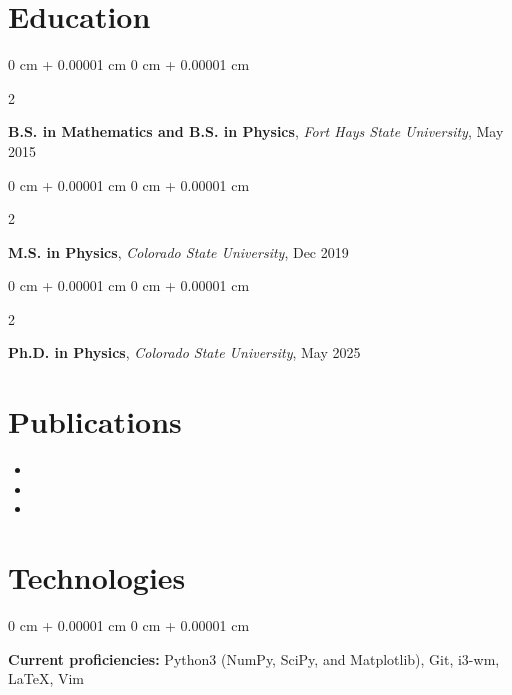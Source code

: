 \documentclass[10pt, letterpaper]{article}
\newenvironment{highlights}{
    \begin{itemize}[
        topsep=0.10 cm,
        parsep=0.10 cm,
        partopsep=0pt,
        itemsep=0pt,
        leftmargin=0 cm + 10pt
    ]
}{
    \end{itemize}
} %
\newenvironment{onecolentry}{
    \begin{adjustwidth}{
        0 cm + 0.00001 cm
    }{
        0 cm + 0.00001 cm
    }
}{
    \end{adjustwidth}
} %
\newenvironment{twocolentry}[2][]{
    \onecolentry
    \def\secondColumn{#2}
    \setcolumnwidth{\fill, 4.5 cm}
    \begin{paracol}{2}
}{
    \switchcolumn \raggedleft \secondColumn
    \end{paracol}
    \endonecolentry
} %
\begin{document}
    \section{Education}

        \begin{twocolentry}{
            May 2015
        }
        \textbf{B.S. in Mathematics and B.S. in Physics}, \textit{Fort Hays State University},  \end{twocolentry}

        \vspace{0.10 cm}

        \begin{twocolentry}{
            Dec 2019
        }
        \textbf{M.S. in Physics}, \textit{Colorado State University},  \end{twocolentry}

        \vspace{0.10 cm}

        \begin{twocolentry}{
            May 2025
        }
        \textbf{Ph.D. in Physics}, \textit{Colorado State University},  \end{twocolentry}

        \vspace{0.10 cm}

    \section{Publications}

        \begin{onecolumnentry}
          \begin{highlights}
            \item {}
            \item {}
            \item {}
          \end{highlights}
        \end{onecolumnentry}

    \section{Technologies}

        \begin{onecolentry}
          \textbf{Current proficiencies:} Python3 (NumPy, SciPy, and Matplotlib), Git, i3-wm, \LaTeX,  Vim
        \end{onecolentry}
\end{document}
